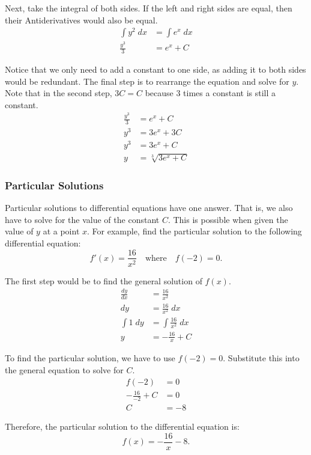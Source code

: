 \noindent Next, take the integral of both sides. If the left and right sides are equal, then their Antiderivatives would also be equal.
\begin{align*}
	\int y^2 \; dx &= \int e^x \; dx \\[5pt]
	\frac{y^3}{3} &= e^x + C
\end{align*}

\noindent Notice that we only need to add a constant to one side, as adding it to both sides would be redundant. The final step is to rearrange the equation and solve for $y$. Note that in the second step, $3C = C$ because $3$ times a constant is still a constant.
\begin{align*}
	\frac{y^3}{3} &= e^x + C \\[5pt]
	y^3 &= 3e^x + 3C \\
	y^3 &= 3e^x + C \\
	y &= \sqrt[3]{3e^x + C}
\end{align*}

\subsubsection{Particular Solutions}
Particular solutions to differential equations have one answer. That is, we also have to solve for the value of the constant $C$. This is possible when given the value of $y$ at a point $x$. For example, find the particular solution to the following differential equation:
\[ f'(x) = \frac{16}{x^2} \quad \text{where} \quad f(-2) = 0. \]

\noindent The first step would be to find the general solution of $f(x)$.
\begin{align*}
	\frac{dy}{dx} &= \frac{16}{x^2} \\[5pt]
	dy &= \frac{16}{x^2} \; dx \\[5pt]
	\int 1 \; dy &= \int \frac{16}{x^2} \; dx \\[5pt]
	y &= -\frac{16}{x} + C
\end{align*}

\noindent To find the particular solution, we have to use $f(-2) = 0$. Substitute this into the general equation to solve for $C$.
\begin{align*}
	f(-2) &= 0 \\
	-\frac{16}{-2} + C &= 0 \\[5pt]
	C &= -8
\end{align*}

\noindent Therefore, the particular solution to the differential equation is:
\[ f(x) = -\frac{16}{x} - 8. \]

